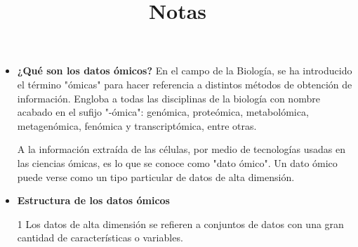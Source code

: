 \documentclass{article}
\begin{document}
\title{Notas}

\begin{itemize}
    \item \textbf{¿Qué son los datos ómicos?}
    En el campo de la Biología, se ha introducido el término "ómicas" para hacer referencia a distintos métodos de 
    obtención de información. Engloba a todas las disciplinas de la biología con nombre acabado en el sufijo "-ómica":
    genómica, proteómica, metabolómica, metagenómica, fenómica y transcriptómica, entre otras.
    
    A la información extraída de las células, por medio de tecnologías usadas en las ciencias ómicas, es lo que se 
    conoce como "dato ómico". Un dato ómico puede verse como un tipo particular de datos de alta dimensión.

    \item \textbf{Estructura de los datos ómicos}



    1 Los datos de alta dimensión se refieren a conjuntos de datos con una gran cantidad de características
    o variables. 

\end{itemize}
\end{document}
